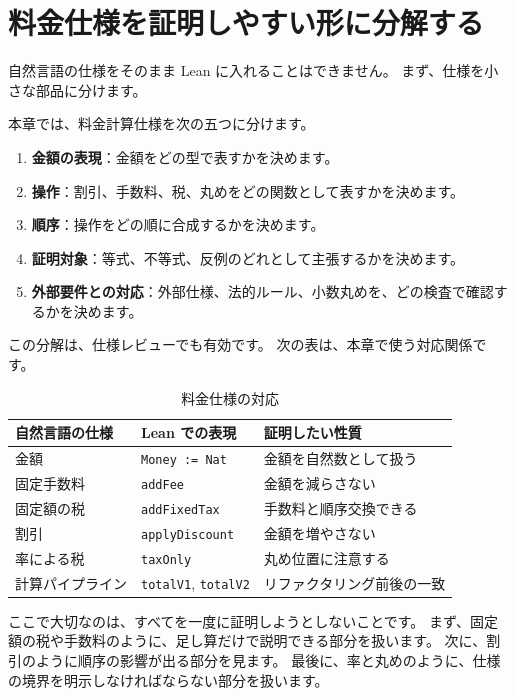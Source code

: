 \section{料金仕様を証明しやすい形に分解する}

自然言語の仕様をそのまま Lean に入れることはできません。
まず、仕様を小さな部品に分けます。

本章では、料金計算仕様を次の五つに分けます。
\begin{enumerate}
\item \textbf{金額の表現}：金額をどの型で表すかを決めます。
\item \textbf{操作}：割引、手数料、税、丸めをどの関数として表すかを決めます。
\item \textbf{順序}：操作をどの順に合成するかを決めます。
\item \textbf{証明対象}：等式、不等式、反例のどれとして主張するかを決めます。
\item \textbf{外部要件との対応}：外部仕様、法的ルール、小数丸めを、どの検査で確認するかを決めます。
\end{enumerate}

この分解は、仕様レビューでも有効です。
次の表は、本章で使う対応関係です。

\begin{table}[htbp]
\centering
\caption{料金仕様の対応}
\label{tab:ch26-spec-decomposition}
\begin{tabular}{lll}
\toprule
自然言語の仕様 & Lean での表現 & 証明したい性質 \\
\midrule
金額 & \texttt{Money := Nat} & 金額を自然数として扱う \\
固定手数料 & \texttt{addFee} & 金額を減らさない \\
固定額の税 & \texttt{addFixedTax} & 手数料と順序交換できる \\
割引 & \texttt{applyDiscount} & 金額を増やさない \\
率による税 & \texttt{taxOnly} & 丸め位置に注意する \\
計算パイプライン & \texttt{totalV1}, \texttt{totalV2} & リファクタリング前後の一致 \\
\bottomrule
\end{tabular}
\end{table}

ここで大切なのは、すべてを一度に証明しようとしないことです。
まず、固定額の税や手数料のように、足し算だけで説明できる部分を扱います。
次に、割引のように順序の影響が出る部分を見ます。
最後に、率と丸めのように、仕様の境界を明示しなければならない部分を扱います。

